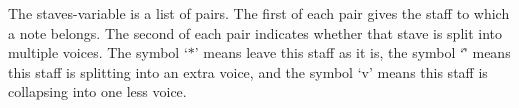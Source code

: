 \noindent The staves-variable is a list of pairs. The
first of each pair gives the staff to which a note
belongs. The second of each pair indicates whether
that stave is split into multiple voices. The symbol
`$\ast$' means leave this staff as it is, the symbol
`\^' means this staff is splitting into an extra
voice, and the symbol `v' means this staff is
collapsing into one less voice.





































